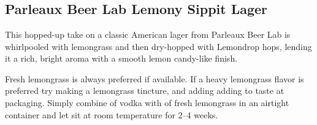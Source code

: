 \part{\styleamericanlager}

\chapter*{Parleaux Beer Lab Lemony Sippit Lager}

\begin{aboutblock}
This hopped-up take on a classic American lager from Parleaux Beer Lab is whirlpooled
with lemongrass and then dry-hopped with Lemondrop hops, lending it a rich, bright aroma
with a smooth lemon candy-like finish.
\end{aboutblock}


\begin{methodandtiming}
  
\begin{mashsteps}
\end{mashsteps}

\begin{fermentationsteps}
\end{fermentationsteps}

\begin{directions}
Fresh lemongrass is always preferred if available. If a heavy lemongrass flavor is preferred
try making a lemongrass tincture, and adding adding to taste at packaging. Simply combine
 of vodka with  of fresh lemongrass in an airtight container and let sit at
room temperature for 2--4 weeks.
\end{directions}

\end{methodandtiming}

\pagebreak

\begin{ingredientsblock}

\begin{malts}
\end{malts}

\begin{hops}
\end{hops}

\begin{yeasts}
\end{yeasts}

\end{ingredientsblock}


